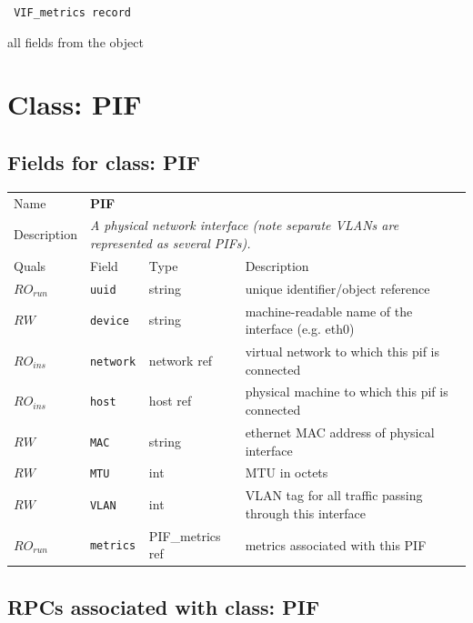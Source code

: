 \vspace{0.3cm}

{\tt 
VIF\_metrics record
}


all fields from the object
\vspace{0.3cm}
\vspace{0.3cm}
\vspace{0.3cm}

\vspace{1cm}
\newpage
\section{Class: PIF}
\subsection{Fields for class: PIF}
\begin{longtable}{|lllp{}|}
\hline
\multicolumn{1}{|l}{Name} & \multicolumn{3}{l|}{\bf PIF} \\
\multicolumn{1}{|l}{Description} & \multicolumn{3}{l|}{\parbox{11cm}{\em A
physical network interface (note separate VLANs are represented as several
PIFs).}} \\
\hline
Quals & Field & Type & Description \\
\hline
$\mathit{RO}_\mathit{run}$ &  {\tt uuid} & string & unique identifier/object reference \\
$\mathit{RW}$ &  {\tt device} & string & machine-readable name of the interface (e.g. eth0) \\
$\mathit{RO}_\mathit{ins}$ &  {\tt network} & network ref & virtual network to which this pif is connected \\
$\mathit{RO}_\mathit{ins}$ &  {\tt host} & host ref & physical machine to which this pif is connected \\
$\mathit{RW}$ &  {\tt MAC} & string & ethernet MAC address of physical interface \\
$\mathit{RW}$ &  {\tt MTU} & int & MTU in octets \\
$\mathit{RW}$ &  {\tt VLAN} & int & VLAN tag for all traffic passing through this interface \\
$\mathit{RO}_\mathit{run}$ &  {\tt metrics} & PIF\_metrics ref & metrics associated with this PIF \\
\hline
\end{longtable}
\subsection{RPCs associated with class: PIF}

